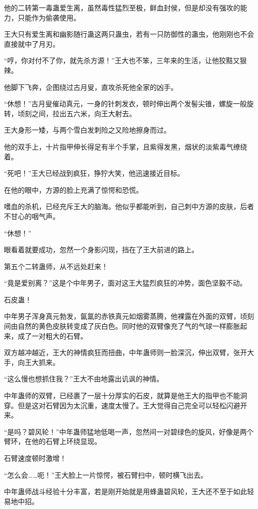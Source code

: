 \begin{this_body}
他的二转第一毒蛊爱生离，虽然毒性猛烈至极，鲜血封侯，但是却没有强攻的能力，只能作为偷袭使用。

王大只有爱生离和幽影随行蛊这两只蛊虫，若有一只防御性的蛊虫，他刚刚也不会直接就中了月刃。

“哼，你对付不了你，就先杀方源！”王大也不笨，三年来的生活，让他狡黠又狠辣。

他脚下飞奔，企图绕过古月叟，直攻杀死他全家的凶手。

“休想！”古月叟催动真元，一身的针刺发衣，顿时伸出两个发髻尖锥，螺旋一般旋转，顷刻之间，拉出五六米，向王大射去。

王大身形一矮，与两个雪白发刺险之又险地擦身而过。

他的双手上，十片指甲伸长得足有半个手掌，且紫得发黑，烟状的淡紫毒气缭绕着。

“死吧！”王大已经战到疯狂，狰狞大笑，他迅速接近目标。

在他的眼中，方源的脸上充满了惊愕和恐慌。

嗜血的杀机，已经充斥王大的脑海。他似乎都能听到，自己刺中方源的皮肤，后者不甘心的咽气声。

“休想！”

眼看着就要成功，忽然一个身影闪现，挡在了王大前进的路上。

第五个二转蛊师，从不远处赶来！

“竟是爱别离？”这是个中年男子，面对这王大猛烈疯狂的冲势，面色坚毅不动。

石皮蛊！

中年男子浑身真元勃发，氤氲的赤铁真元如烟雾蒸腾，他裸露在外面的双臂，顷刻间由自然的黄色皮肤转变成了灰白色。同时他的双臂像充了气的气球一样膨胀起来，成了一对粗大的石臂。

双方越冲越近，王大的神情疯狂而扭曲，中年蛊师则一脸深沉，伸出双臂，张开大手，向王大抓来。

“这么慢也想抓住我？”王大不由地露出讥讽的神情。

中年蛊师的双臂，已经裹了一层十分厚实的石皮，就算是他王大的指甲也不能洞穿。但是这对石臂因为太沉重，速度太慢了。王大觉得自己完全可以轻松闪避开来。

“是吗？碧风轮！”中年蛊师猛地低喝一声，忽然间一对碧绿色的旋风，好像是两个臂环，在他的石臂上环绕显现。

石臂速度顿时激增！

“怎么会……呃！”王大脸上一片惊愕，被石臂扫中，顿时横飞出去。

中年蛊师战斗经验十分丰富，若是刚开始就是用蜂蛊碧风轮，王大还不至于如此轻易地中招。


\end{this_body}
